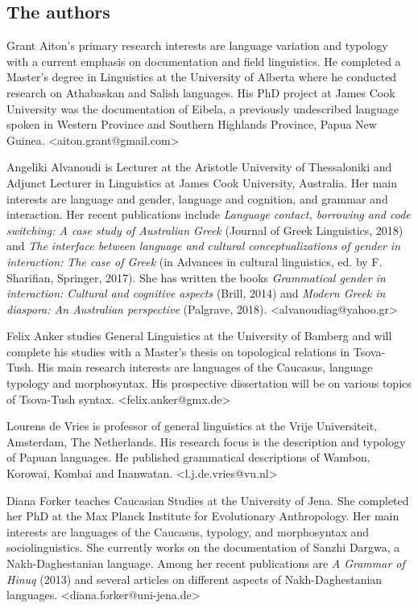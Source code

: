 \begin{refsection}
\subsection*{The authors}

Grant Aiton's primary research interests are language variation and typology with a current emphasis on documentation and field linguistics. He completed a Master's degree in Linguistics at the University of Alberta where he conducted research on Athabaskan and Salish languages. His PhD project at James Cook University was the documentation of Eibela, a previously undescribed language spoken in Western Province and Southern Highlands Province, Papua New Guinea. <aiton.grant@gmail.com>

Angeliki Alvanoudi is Lecturer at the Aristotle University of Thessaloniki and Adjunct Lecturer in Linguistics at James Cook University, Australia. Her main interests are language and gender, language and cognition, and grammar and interaction. Her recent publications include \textit{Language contact, borrowing and code switching: A case study of Australian Greek} (Journal of Greek Linguistics, 2018) and \textit{The interface between language and cultural conceptualizations of gender in interaction: The case of Greek} (in Advances in cultural linguistics, ed. by F. Sharifian, Springer, 2017). She has written the books \textit{Grammatical gender in interaction: Cultural and cognitive aspects} (Brill, 2014) and \textit{Modern Greek in diaspora: An Australian perspective} (Palgrave, 2018). <alvanoudiag@yahoo.gr> 

Felix Anker studies General Linguistics at the University of Bamberg and will complete his studies with a Master’s thesis on topological relations in Tsova-Tush. His main research interests are languages of the Caucasus, language typology and morphosyntax. His prospective dissertation will be on various topics of Tsova-Tush syntax.
<felix.anker@gmx.de>

Lourens de Vries is professor of general linguistics at the Vrije Universiteit, Amsterdam, The Netherlands. His research focus is the description and typology of Papuan languages. He published grammatical descriptions of Wambon, Korowai, Kombai and Inanwatan. <l.j.de.vries@vu.nl>

Diana Forker teaches Caucasian Studies at the University of Jena. She completed her PhD at the Max Planck Institute for Evolutionary Anthropology. Her main interests are languages of the Caucasus, typology, and morphosyntax and sociolinguistics. She currently works on the documentation of Sanzhi Dargwa, a Nakh-Daghestanian language. Among her recent publications are \textit{A Grammar of Hinuq} (2013) and several articles on different aspects of Nakh-Daghestanian languages.  <diana.forker@uni-jena.de>


\end{refsection}
